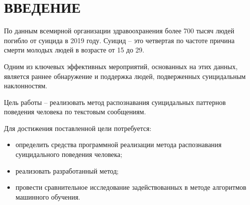 \section*{ВВЕДЕНИЕ}

По данным всемирной организации здравоохранения более 700 тысяч людей погибло от суицида в 2019 году. Суицид -- это четвертая по частоте причина смерти молодых людей в возрасте от 15 до 29. \cite{suicideVOZ}

Одним из ключевых эффективных мероприятий, основанных на этих данных, является раннее обнаружение и поддержка людей, подверженных суицидальным наклонностям.

Цель работы -- реализовать метод распознавания суицидальных паттернов поведения человека по текстовым сообщениям.

Для достижения поставленной цели потребуется:
\begin{itemize}
	\item определить средства программной реализации метода распознавания суицидального поведения человека;
	\item реализовать разработанный метод;
	\item провести сравнительное исследование задействованных в методе алгоритмов машинного обучения.
\end{itemize}

\pagebreak